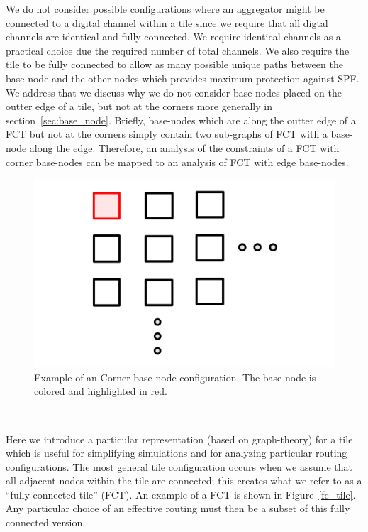 We do not consider possible configurations where an aggregator might be connected to a digital channel within a tile since we require that all digtal channels are identical and fully connected.
We require identical channels as a practical choice due the required number of total channels.
We also require the tile to be fully connected to allow as many possible unique paths between the base-node and the other nodes which provides maximum protection against SPF.
We address that we discuss why we do not consider base-nodes placed on the outter edge of a tile, but not at the corners more generally in section~\ref{sec:base_node}.
Briefly, base-nodes which are along the outter edge of a FCT but not at the corners simply contain two sub-graphs of FCT with a base-node along the edge.
Therefore, an analysis of the constraints of a FCT with corner base-nodes can be mapped to an analysis of FCT with edge base-nodes.

\begin{figure}[]
\centering
\includegraphics[width=\textwidth]{images/CBN.pdf}
\caption{Example of an Corner base-node configuration. The base-node is colored and highlighted in red.}
\end{figure}~\label{fig:cbn}


Here we introduce a particular representation (based on graph-theory) for a tile which is useful for simplifying simulations and for analyzing particular routing configurations.
The most general tile configuration occurs when we assume that all adjacent nodes within the tile are connected; this creates what we refer to as a ``fully connected tile'' (FCT).
An example of a FCT is shown in Figure~\ref{fc_tile}.
Any particular choice of an effective routing must then be a subset of this fully connected version.

